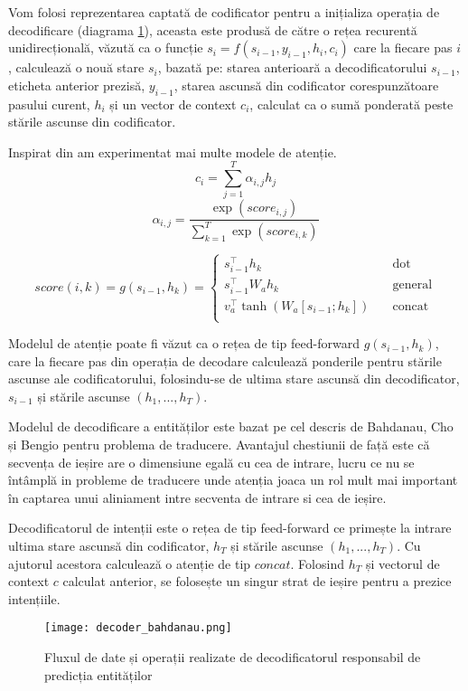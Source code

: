 Vom folosi reprezentarea captată de codificator pentru a inițializa operația de decodificare (diagrama \ref{fig:dec_bah}), aceasta este produsă de către o rețea recurentă unidirecțională, văzută ca o funcție $s_i=f(s_{i-1}, y_{i-1}, h_i, c_i)$ care la fiecare pas $i$, calculează o nouă stare $s_i$, bazată pe: starea anterioară a decodificatorului $s_{i-1}$, eticheta anterior prezisă, $y_{i-1}$, starea ascunsă din codificator corespunzătoare pasului curent, $h_i$ și un vector de context $c_i$, calculat ca o sumă ponderată peste stările ascunse din codificator.

Inspirat din \cite{trans_luong_manning} am experimentat mai multe modele de atenție.
$$ c_i = \sum_{j=1}^{T} \alpha_{i,j} h_j$$
$$ \alpha_{i,j} = \frac{\exp(score_{i, j})}{\sum_{k=1}^{T} \exp(score_{i, k})}$$

\label{attn-types}
\[ score(i, k) = g(s_{i-1}, h_k) =
\begin{cases}
s_{i-1}^\top h_k			&	\quad \text{dot}\\
s_{i-1}^\top W_a h_k	&	\quad \text{general}\\
v_a^\top \tanh(W_a [s_{i-1};h_k])	&	\quad \text{concat}\\
\end{cases}
\]

Modelul de atenție poate fi văzut ca o rețea de tip feed-forward $g(s_{i-1}, h_k)$, care la fiecare pas din operația de decodare calculează ponderile pentru stările ascunse ale codificatorului, folosindu-se de ultima stare ascunsă din decodificator, $s_{i-1}$ și stările ascunse $(h_1, ..., h_T)$.

Modelul de decodificare a entităților este bazat pe cel descris de Bahdanau, Cho și Bengio \cite{bahdanau} pentru problema de traducere. Avantajul chestiunii de față este că secvența de ieșire are o dimensiune egală cu cea de intrare, lucru ce nu se întâmplă in probleme de traducere unde atenția joaca un rol mult mai important în captarea unui aliniament intre secventa de intrare si cea de ieșire. 

Decodificatorul de intenții este o rețea de tip feed-forward ce primește la intrare ultima stare ascunsă din codificator, $h_T$ și stările ascunse $(h_1, ..., h_T)$. Cu ajutorul acestora calculează o atenție de tip $concat$. Folosind $h_T$ și vectorul de context $c$ calculat anterior, se folosește un singur strat de ieșire pentru a prezice intențiile.

\begin{figure}[h]
	\centering
	\texttt{[image: decoder\_bahdanau.png]}
	\caption{Fluxul de date și operații realizate de decodificatorul responsabil de predicția entităților}
	\label{fig:dec_bah}
\end{figure}

